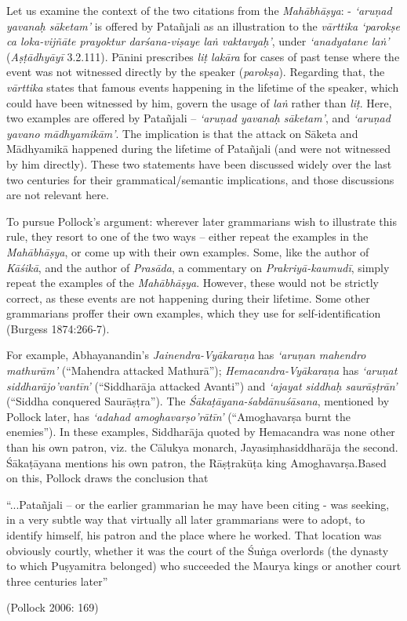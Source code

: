 Let us examine the context of the two citations from the {\sl Mahābhāṣya}: - {\sl `aruṇad yavanaḥ sāketam'} is offered by Patañjali as an illustration to the {\sl vārttika `parokṣe ca loka-vijñāte prayoktur darśana-viṣaye laṅ vaktavyaḥ'}, under {\sl `anadyatane laṅ'} ({\sl Aṣṭādhyāyī} 3.2.111). Pānini prescribes {\sl liṭ lakāra} for cases of past tense where the event was not witnessed directly by the speaker ({\sl parokṣa}). Regarding that, the {\sl vārttika} states that famous events happening in the lifetime of the speaker, which could have been witnessed by him, govern the usage of {\sl laṅ} rather than {\sl liṭ}. Here, two examples are offered by Patañjali -- {\sl `aruṇad yavanaḥ sāketam'}, and {\sl `aruṇad yavano mādhyamikām'}. The implication is that the attack on Sāketa and Mādhyamikā happened during the lifetime of Patañjali (and were not witnessed by him directly). These two statements have been discussed widely over the last two centuries for their grammatical/semantic implications, and those discussions are not relevant here.

To pursue Pollock's argument: wherever later grammarians wish to illustrate this rule, they resort to one of the two ways -- either repeat the examples in the {\sl Mahābhāṣya}, or come up with their own examples. Some, like the author of {\sl Kāśikā}, and the author of {\sl Prasāda}, a commentary on {\sl Prakriyā-kaumudī}, simply repeat the examples of the {\sl Mahābhāṣya}. However, these would not be strictly correct, as these events are not happening during their lifetime. Some other grammarians proffer their own examples, which they use for self-identification (Burgess 1874:266-7).

For example, Abhayanandin's {\sl Jainendra-Vyākaraṇa} has {\sl `aruṇan mahendro mathurām'} (``Mahendra attacked Mathurā''); {\sl Hemacandra-Vyākaraṇa} has {\sl `aruṇat siddharājo’vantīn'} (``Siddharāja attacked Avanti'') and {\sl `ajayat siddhaḥ saurāṣṭrān'} (``Siddha conquered Saurāṣṭra''). The {\sl Śākaṭāyana-śabdānuśāsana}, mentioned by Pollock later, has {\sl `adahad amoghavarṣo'\-rātīn'} (``Amoghavarṣa burnt the enemies''). In these examples, Siddharāja quoted by Hemacandra was none other than his own patron, viz. the Cālukya monarch, Jayasiṃhasiddharāja the second. Śākaṭā\-yana mentions his own patron, the Rāṣṭrakūṭa king Amoghavarṣa.\break Based on this, Pollock draws the conclusion that 
\begin{myquote}
``...Patañjali -- or the earlier grammarian he may have been citing - was seeking, in a very subtle way that virtually all later grammarians were to adopt, to identify himself, his patron and the place where he worked. That location was obviously courtly, whether it was the court of the Śuṅga overlords (the dynasty to which Puṣyamitra belonged) who succeeded the Maurya kings or another court three centuries later''

\hfill (Pollock 2006: 169)
\end{myquote}

